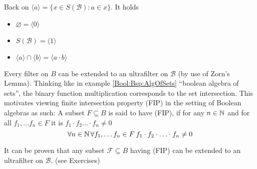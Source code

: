 Back on $\langle a\rangle = \{x\in S(\mathcal{B}): a\in x\}$. It holds
\begin{itemize}
    \item $\varnothing = \langle 0\rangle $
    \item $S(\mathcal{B}) = \langle 1\rangle $
    \item $\langle a\rangle \cap \langle b\rangle  = \langle a\cdot b\rangle $
\end{itemize}
Every filter on $B$ can be extended to an ultrafilter on $\mathcal{B}$ (by use of Zorn's Lemma).
Thinking like in example \ref{Bool:Bsp:AlgOfSets} ``boolean algebra of sets'', the binary function multiplication corresponds to the set intersection. This motivates viewing finite intersection property (FIP) in the setting of Boolean algebras as such:
A subset $F\subseteq B$ is said to have (FIP), if for any $n\in\mathbb{N}$ and for all $ f_1,\dots f_n\in F$ it is $f_1\cdot f_2 \dots \cdot f_n \neq 0$
\[\forall n\in \mathbb{N} \, \forall f_1,\dots f_n\in F \: f_1\cdot f_2\cdot \ldots \cdot f_n \neq 0\]

It can be proven that any subset $\mathcal{F}\subseteq B$ having (FIP) can be extended to an ultrafilter on $\mathcal{B}$.
(see Exercises)


